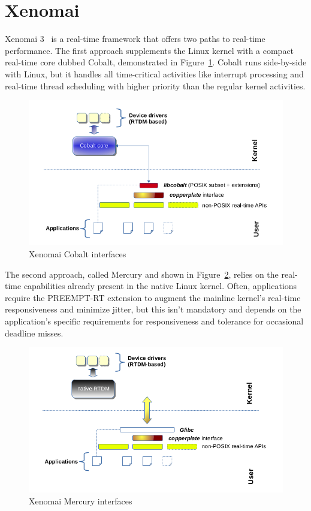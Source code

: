 \documentclass[MMR,Master,english]{twbook}
\begin{document}
\section{Xenomai}
\noindent Xenomai 3~\cite{XenomaiXenomai} is a real-time framework that offers two paths to real-time performance. The first approach supplements the Linux kernel with a compact real-time core dubbed Cobalt, demonstrated in Figure~\ref{fig:cobalt}. Cobalt runs side-by-side with Linux, but it handles all time-critical activities like interrupt processing and real-time thread scheduling with higher priority than the regular kernel activities. 

\begin{figure}[H]
	\centering
	\includegraphics[width=0.6\columnwidth]{img/x3-cobalt-interfaces.png}
	\caption[Xenomai Cobalt interfaces]{Xenomai Cobalt interfaces}
	\label{fig:cobalt}
\end{figure}

\bigskip \noindent  The second approach, called Mercury and shown in Figure~\ref{fig:mercury}, relies on the real-time capabilities already present in the native Linux kernel. Often, applications require the PREEMPT-RT extension to augment the mainline kernel's real-time responsiveness and minimize jitter, but this isn't mandatory and depends on the application's specific requirements for responsiveness and tolerance for occasional deadline misses. 


\begin{figure}[H]
	\centering
	\includegraphics[width=0.6\columnwidth]{img/x3-mercury-interfaces.png}
	\caption[Xenomai Mercury interfaces]{Xenomai Mercury interfaces}
	\label{fig:mercury}
\end{figure}
\end{document}
